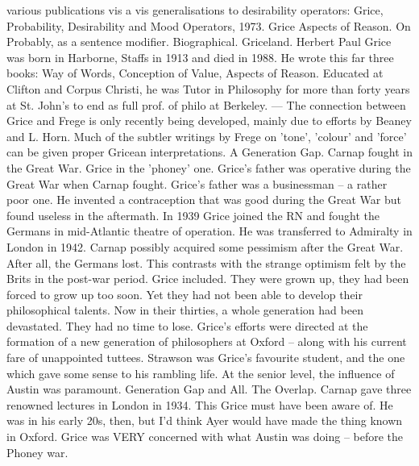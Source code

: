 \documentclass[10pt,titlepage]{book}
\begin{document}
various publications vis a  vis generalisations to desirability operators:  
Grice, Probability, Desirability and Mood  Operators, 1973. Grice Aspects of 
Reason. On Probably, as a sentence modifier.   
Biographical.  Griceland. Herbert Paul Grice was born in Harborne, Staffs 
in 1913 and died in  1988. He wrote this far three books: Way of Words, 
Conception of Value, Aspects  of Reason. Educated at Clifton and Corpus Christi, 
he was Tutor in Philosophy  for more than forty years at St. John's to end 
as full prof. of philo at  Berkeley. ---  The connection between Grice and 
Frege is only recently being developed, mainly  due to efforts by Beaney and 
L. Horn. Much of the subtler writings by Frege on  'tone', 'colour' and 
'force' can be given proper Gricean  interpretations. 
A  Generation Gap. Carnap fought in the Great War. Grice in the 'phoney' 
one.  Grice's father was operative during the Great War when Carnap fought. 
Grice's  father was a businessman -- a rather poor one. He invented a 
contraception that  was good during the Great War but found useless in the 
aftermath. In 1939 Grice  joined the RN and fought the Germans in mid-Atlantic 
theatre of operation. He  was transferred to Admiralty in London in 1942. Carnap 
possibly acquired some  pessimism after the Great War. After all, the Germans 
lost. This contrasts  with the strange optimism felt by the Brits in the 
post-war period. Grice  included. They were grown up, they had been forced to 
grow up too soon. Yet they  had not been able to develop their philosophical 
talents. Now in their thirties,  a whole generation had been devastated. 
They had no time to lose. Grice's  efforts were directed at the formation of a 
new generation of philosophers at  Oxford -- along with his current fare of 
unappointed tuttees. Strawson was  Grice's favourite student, and the one 
which gave some sense to his rambling  life. At the senior level, the 
influence of Austin was  paramount. 
Generation  Gap and All. The Overlap. Carnap gave three renowned lectures 
in London in 1934. This  Grice must have been aware of. He was in his early 
20s, then, but I’d think Ayer  would have made the thing known in Oxford. 
Grice was VERY  concerned with  what Austin was doing -- before the Phoney war.
\end{document}
